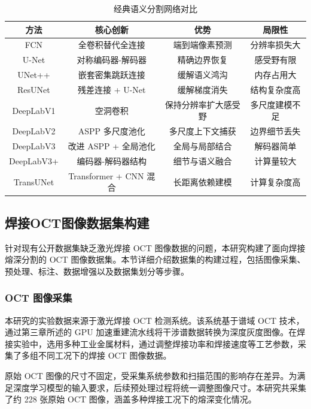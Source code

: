 \begin{table}[htbp]
\centering
\caption{经典语义分割网络对比}
\label{tab:segmentation_comparison}
\begin{tabular}{cccc}
\toprule
\textbf{方法} & \textbf{核心创新} & \textbf{优势} & \textbf{局限性} \\
\midrule
FCN & 全卷积替代全连接 & 端到端像素预测 & 分辨率损失大 \\
U-Net & 对称编码器-解码器 & 精确边界恢复 & 感受野有限 \\
UNet++ & 嵌套密集跳跃连接 & 缓解语义鸿沟 & 内存占用大 \\
ResUNet & 残差连接 + U-Net & 缓解梯度消失 & 结构复杂度高 \\
DeepLabV1 & 空洞卷积 & 保持分辨率扩大感受野 & 多尺度建模不足 \\
DeepLabV2 & ASPP 多尺度池化 & 多尺度上下文捕获 & 边界细节丢失 \\
DeepLabV3 & 改进 ASPP + 全局池化 & 全局与局部结合 & 解码器简单 \\
DeepLabV3+ & 编码器-解码器结构 & 细节与语义融合 & 计算量较大 \\
TransUNet & Transformer + CNN 混合 & 长距离依赖建模 & 计算复杂度高 \\
\bottomrule
\end{tabular}
\end{table}

\subsection{焊接OCT图像数据集构建}

针对现有公开数据集缺乏激光焊接 OCT 图像数据的问题，本研究构建了面向焊接熔深分割的 OCT 图像数据集。本节详细介绍数据集的构建过程，包括图像采集、预处理、标注、数据增强以及数据集划分等步骤。

\subsubsection{OCT 图像采集}

本研究的实验数据来源于激光焊接 OCT 检测系统。该系统基于谱域 OCT 技术，通过第三章所述的 GPU 加速重建流水线将干涉谱数据转换为深度灰度图像。在焊接实验中，选用多种工业金属材料，通过调整焊接功率和焊接速度等工艺参数，采集了多组不同工况下的焊接 OCT 图像数据。

原始 OCT 图像的尺寸不固定，受采集系统参数和扫描范围的影响存在差异。为满足深度学习模型的输入要求，后续预处理过程将统一调整图像尺寸。本研究共采集了约 228 张原始 OCT 图像，涵盖多种焊接工况下的熔深变化情况。

